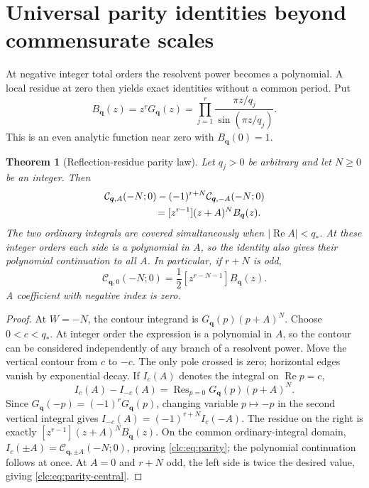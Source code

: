 \documentclass[11pt,a4paper]{article}
\numberwithin{equation}{section}
\newtheorem{theorem}{Theorem}[section]
\theoremstyle{definition}\newtheorem{definition}[theorem]{Definition}
\theoremstyle{remark}\newtheorem{remark}[theorem]{Remark}
\DeclareMathOperator{\Rea}{Re}
\DeclareMathOperator{\Res}{Res}
\newcommand{\bq}{\boldsymbol q}\newcommand{\bs}{\boldsymbol s}
\newcommand{\CC}{\mathcal C}\newcommand{\UU}{\mathcal U}\newcommand{\EE}{\mathcal E}
\begin{document}
\section{Universal parity identities beyond commensurate scales}
\label{clc:sec:parity}

At negative integer total orders the resolvent power becomes a
polynomial. A local residue at zero then yields exact identities
without a common period. Put
\begin{equation}\label{clc:eq:Bq}
 B_{\bq}(z)=z^rG_{\bq}(z)
       =\prod_{j=1}^r\frac{\pi z/q_j}{\sin(\pi z/q_j)}.
\end{equation}
This is an even analytic function near zero with $B_{\bq}(0)=1$.

\begin{theorem}[Reflection-residue parity law]
\label{clc:thm:parity}
Let $q_j>0$ be arbitrary and let $N\ge0$ be an integer. Then
\begin{align}
 &\CC_{\bq,A}(-N;0)-(-1)^{r+N}\CC_{\bq,-A}(-N;0)\notag\\
 &\hspace{18mm}=[z^{r-1}](z+A)^N B_{\bq}(z).
 \label{clc:eq:parity}
\end{align}
The two ordinary integrals are covered simultaneously when
$|\Rea A|<q_*$. At these integer orders each side is a polynomial in
$A$, so the identity also gives their polynomial continuation to all $A$.
In particular, if $r+N$ is odd,
\begin{equation}\label{clc:eq:parity-central}
 \boxed{\displaystyle
 \CC_{\bq,0}(-N;0)=\frac12[z^{r-N-1}]B_{\bq}(z).}
\end{equation}
A coefficient with negative index is zero.
\end{theorem}
\begin{proof}
At $W=-N$, the contour integrand is
$G_{\bq}(p)(p+A)^N$. Choose $0<c<q_*$. At integer order the expression
is a polynomial in $A$, so the contour can be considered independently
of any branch of a resolvent power. Move the vertical contour from $c$
to $-c$. The only pole crossed is zero; horizontal edges vanish by
exponential decay. If $I_c(A)$ denotes the integral on $\Rea p=c$,
\[
 I_c(A)-I_{-c}(A)=\Res_{p=0}G_{\bq}(p)(p+A)^N.
\]
Since $G_{\bq}(-p)=(-1)^rG_{\bq}(p)$, changing variable $p\mapsto-p$
in the second vertical integral gives
$I_{-c}(A)=(-1)^{r+N}I_c(-A)$.
The residue on the right is exactly
$[z^{r-1}](z+A)^NB_{\bq}(z)$. On the common ordinary-integral domain,
$I_c(\pm A)=\CC_{\bq,\pm A}(-N;0)$, proving
\eqref{clc:eq:parity}; the polynomial continuation follows at once.
At $A=0$ and $r+N$ odd, the left side is twice the desired value,
giving \eqref{clc:eq:parity-central}.
\end{proof}
\end{document}
